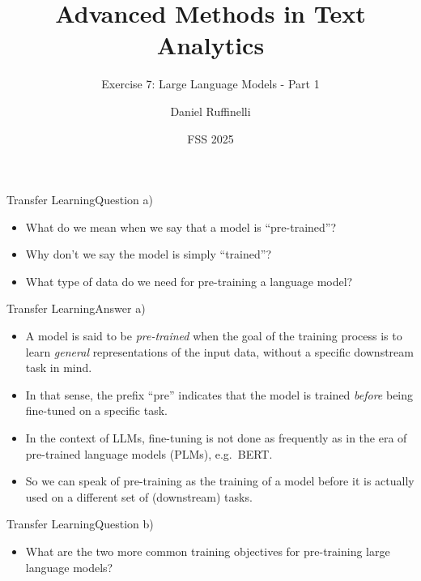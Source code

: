 \documentclass[t]{beamer}
\title[Write your short title here]{Advanced Methods in Text Analytics}
\subtitle{Exercise 7: Large Language Models - Part 1}
\author{Daniel Ruffinelli}
\institute{University of Mannheim}
\date{FSS 2025}
\begin{document}

\begin{frame}
    \titlepage{}
\end{frame}

\begin{frame}{Transfer Learning}{Question a)}
    \begin{itemize}
        \item What do we mean when we say that a model is ``pre-trained''?
        \item Why don't we say the model is simply ``trained''?
        \item What type of data do we need for pre-training a language model?
    \end{itemize}
\end{frame}

\begin{frame}{Transfer Learning}{Answer a)}
    \begin{itemize}
        \item A model is said to be \emph{pre-trained} when the goal of the
              training process is to learn \emph{general} representations of the
              input data, without a specific downstream task in mind.
        \item In that sense, the prefix ``pre'' indicates that the
              model is trained \emph{before} being fine-tuned on a specific
              task.
        \item In the context of LLMs, fine-tuning is not done as frequently as
              in the era of pre-trained language models (PLMs), e.g.\ BERT.
        \item So we can speak of pre-training as the training of a model before
              it is actually used on a different set of (downstream) tasks.
    \end{itemize}
\end{frame}

\begin{frame}{Transfer Learning}{Question b)}
    \begin{itemize}
        \item What are the two more common training objectives for pre-training
              large language models?
    \end{itemize}
\end{frame}
\end{document}
